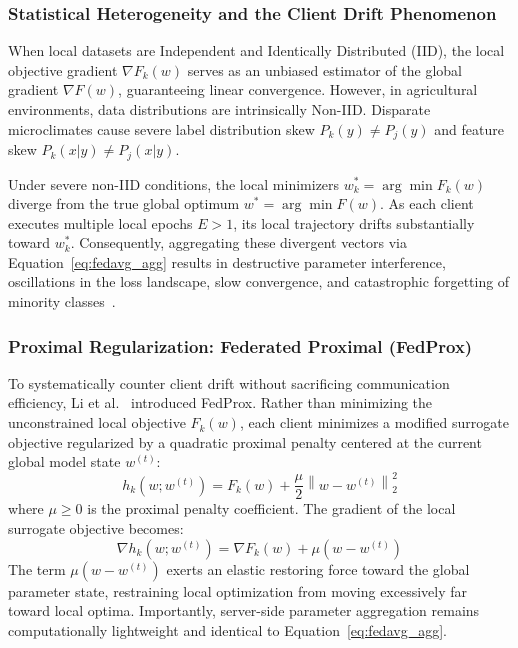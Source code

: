 \documentclass[applsci,article,submit,oneauthor,pdftex]{Definitions/mdpi}
\begin{document}
\subsubsection{Statistical Heterogeneity and the Client Drift Phenomenon}
When local datasets are Independent and Identically Distributed (IID), the local objective gradient $\nabla F_k(w)$ serves as an unbiased estimator of the global gradient $\nabla F(w)$, guaranteeing linear convergence. However, in agricultural environments, data distributions are intrinsically Non-IID. Disparate microclimates cause severe label distribution skew $P_k(y) \neq P_j(y)$ and feature skew $P_k(x|y) \neq P_j(x|y)$.

Under severe non-IID conditions, the local minimizers $w_k^* = \arg\min F_k(w)$ diverge from the true global optimum $w^* = \arg\min F(w)$. As each client executes multiple local epochs $E > 1$, its local trajectory drifts substantially toward $w_k^*$. Consequently, aggregating these divergent vectors via Equation~\eqref{eq:fedavg_agg} results in destructive parameter interference, oscillations in the loss landscape, slow convergence, and catastrophic forgetting of minority classes~\cite{kairouz2021advances}.

\subsubsection{Proximal Regularization: Federated Proximal (FedProx)}
To systematically counter client drift without sacrificing communication efficiency, Li et al.~\cite{li2020federated} introduced FedProx. Rather than minimizing the unconstrained local objective $F_k(w)$, each client minimizes a modified surrogate objective regularized by a quadratic proximal penalty centered at the current global model state $w^{(t)}$:
\begin{equation}
h_k(w; w^{(t)}) = F_k(w) + \frac{\mu}{2} \left\| w - w^{(t)} \right\|_2^2
\label{eq:fedprox_obj}
\end{equation}
where $\mu \ge 0$ is the proximal penalty coefficient. The gradient of the local surrogate objective becomes:
\begin{equation}
\nabla h_k(w; w^{(t)}) = \nabla F_k(w) + \mu (w - w^{(t)})
\label{eq:fedprox_grad}
\end{equation}
The term $\mu (w - w^{(t)})$ exerts an elastic restoring force toward the global parameter state, restraining local optimization from moving excessively far toward local optima. Importantly, server-side parameter aggregation remains computationally lightweight and identical to Equation~\eqref{eq:fedavg_agg}.
\end{document}
